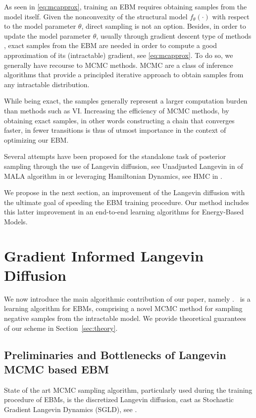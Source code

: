 \documentclass[10pt,twocolumn,letterpaper]{article}
\begin{document}
As seen in \eqref{eq:mcapprox}, training an EBM requires obtaining samples from the model itself.
Given the nonconvexity of the structural model $f_\theta(\cdot)$ with respect to the model parameter $\theta$, direct sampling is not an option.
Besides, in order to update the model parameter $\theta$, usually through gradient descent type of methods \cite{bottou2008},  exact samples from the EBM are needed in order to compute a good approximation of its (intractable) gradient, see \eqref{eq:mcapprox}.
To do so, we generally have recourse to MCMC methods.
MCMC are a class of inference algorithms that provide a principled iterative approach to obtain samples from any intractable distribution.

While being exact, the samples generally represent a larger computation burden than methods such as VI.
Increasing the efficiency of MCMC methods, by obtaining exact samples, in other words constructing a chain that converges faster, in fewer transitions is thus of utmost importance in the context of optimizing our EBM.

Several attempts have been proposed for the standalone task of posterior sampling through the use of Langevin diffusion, see Unadjusted Langevin in \cite{brosse2017tamed} of MALA algorithm in \cite{roberts,robertsmala,durmus2017fast} or leveraging Hamiltonian Dynamics, see HMC in \cite{girolami}.

We propose in the next section, an improvement of the Langevin diffusion with the ultimate goal of speeding the EBM training procedure.
Our method includes this latter improvement in an end-to-end learning algorithms for Energy-Based Models.

\section{Gradient Informed Langevin Diffusion}\label{sec:main}

We now introduce the main algorithmic contribution of our paper, namely \algo.
\algo\ is a learning algorithm for EBMs, comprising a novel MCMC method for sampling negative samples from the intractable model.
We provide theoretical guarantees of our scheme in Section~\ref{sec:theory}.

\subsection{Preliminaries and Bottlenecks of Langevin MCMC based EBM}
State of the art MCMC sampling algorithm, particularly used during the training procedure of EBMs, is the discretized Langevin diffusion, cast as Stochastic Gradient Langevin Dynamics (SGLD), see \cite{welling2011bayesian}.
\end{document}
